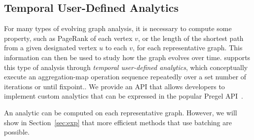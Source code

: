 \subsection{Temporal User-Defined Analytics}
\label{sec:analytics}

For many types of evolving graph analysis, it is necessary to compute
some property, such as PageRank of each vertex $v$, or the length of
the shortest path from a given designated vertex $u$ to each $v$, for
each representative graph.  This information can then be used to study
how the graph evolves over time.  \ql supports this type of analysis
through {\em temporal user-defined analytics}, which conceptually
execute an aggregation-map operation sequence repeatedly over a set
number of iterations or until fixpoint..  We provide an API that allows developers to implement custom
analytics that can be expressed in the popular Pregel
API~\cite{DBLP:conf/sigmod/MalewiczABDHLC10}.

An analytic can be computed on each representative graph.  However, we
will show in Section~\ref{sec:exp} that more efficient methods that
use batching are possible.  
